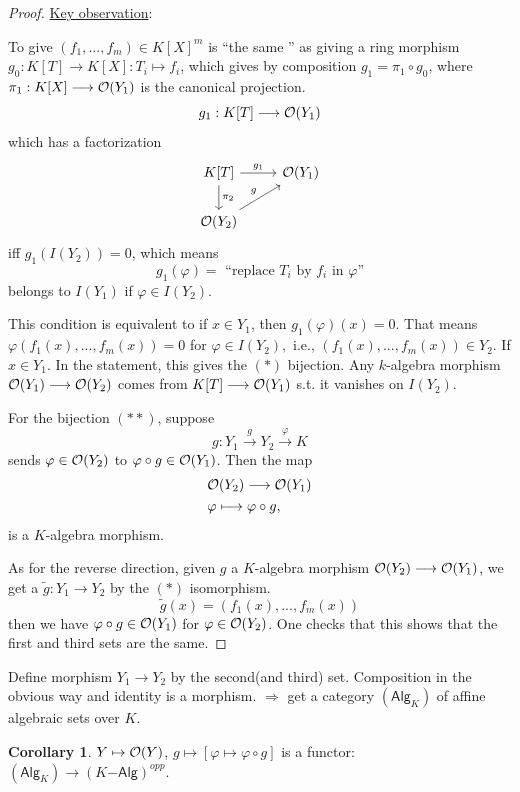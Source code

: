 \documentclass[11pt]{article}
\theoremstyle{definition}
\newtheorem{cor}[thm]{Corollary}
\newcommand{\calo}{{\cal O}}
\newcommand{\Lrta}{\Longrightarrow}
\newcommand{\lrta}{\longrightarrow}
\begin{document}
\begin{proof}
\underline{Key observation}:

To give $(f_1,...,f_m)\in K[X]^m$ is ``the same '' as giving a ring morphism $g_0:K[T]\lrta K[X]: T_i\mapsto f_i$, which gives by composition $g_1=\pi_1\circ g_0$, where $\pi_1: K[X]\lrta \calo(Y_1)$ is the canonical projection.
$$
g_1: K[T]\lrta \calo(Y_1)
$$
which has a factorization
\[
\begin{tikzcd}
K[T] \arrow[r,"g_1"] \arrow[d,"\pi_2"]  & \calo(Y_1)  \\
   \calo(Y_2) \arrow[ur,"g"] & 
\end{tikzcd}
\]
iff $g_1(I(Y_2))=0$, which means 
$$
g_1(\varphi)=\text{ ``replace $T_i$ by $f_i$ in $\varphi$''}
$$
belongs to $I(Y_1)$ if $\varphi\in I(Y_2)$.

This condition is equivalent to if $x\in Y_1$, then $g_1(\varphi)(x)=0$. That means $\varphi(f_1(x),...,f_m(x))=0$ for $\varphi\in I(Y_2),$ i.e., $(f_1(x),...,f_m(x))\in Y_2$. If $x\in Y_1$. In the statement, this gives the $(*)$ bijection. Any $k$-algebra morphism $\calo(Y_1)\lrta\calo(Y_2)$  comes from $K[T]\lrta \calo(Y_1)$ s.t. it vanishes on $I(Y_2)$.


For the bijection $(**)$, suppose 
$$
g:Y_1\overset{g}{\lrta} Y_2\overset{\varphi}{\lrta} K
$$
sends $\varphi\in \calo(Y_2)$ to $\varphi\circ g\in\calo(Y_1)$. Then the map 
$$
\begin{aligned}
& \calo(Y_2)\lrta \calo(Y_1)\\
&\varphi\longmapsto \varphi\circ g,
\end{aligned}
$$
is a $K$-algebra morphism.

As for the reverse direction, given $g$ a $K$-algebra morphism $\calo(Y_2)\lrta \calo(Y_1)$, we get a $\tilde{g}:Y_1\lrta Y_2$ by the $(*)$ isomorphism.
$$
\tilde{g}(x)=(f_1(x),...,f_m(x))
$$
then we have $\varphi\circ g\in\calo(Y_1)$ for $\varphi\in \calo(Y_2)$. One checks that this shows that the first and third sets are the same.
\end{proof}

Define morphism $Y_1\lrta Y_2$ by the second(and third) set.  Composition in the obvious way and identity is a morphism.
$\Lrta$ get a category $(\mathsf{Alg}_K)$ of affine algebraic sets over $K$.

\begin{cor}
$Y\mapsto \calo(Y)$, $g\mapsto [\varphi\mapsto \varphi\circ g]$ is a functor: $(\mathsf{Alg}_K)\lrta (K\mathsf{-Alg})^{opp}$.
\end{cor}
\end{document}

